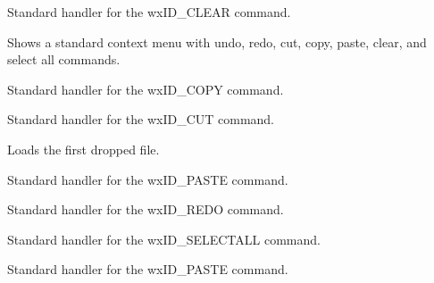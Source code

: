 
Standard handler for the wxID\_CLEAR command.

\label{wxrichtextctrloncontextmenu}


Shows a standard context menu with undo, redo, cut, copy, paste, clear, and select all commands.

\label{wxrichtextctrloncopy}


Standard handler for the wxID\_COPY command.

\label{wxrichtextctrloncut}


Standard handler for the wxID\_CUT command.

\label{wxrichtextctrlondropfiles}


Loads the first dropped file.

\label{wxrichtextctrlonpaste}


Standard handler for the wxID\_PASTE command.

\label{wxrichtextctrlonredo}


Standard handler for the wxID\_REDO command.

\label{wxrichtextctrlonselectall}


Standard handler for the wxID\_SELECTALL command.

\label{wxrichtextctrlonundo}


Standard handler for the wxID\_PASTE command.

\label{wxrichtextctrlonupdateclear}


